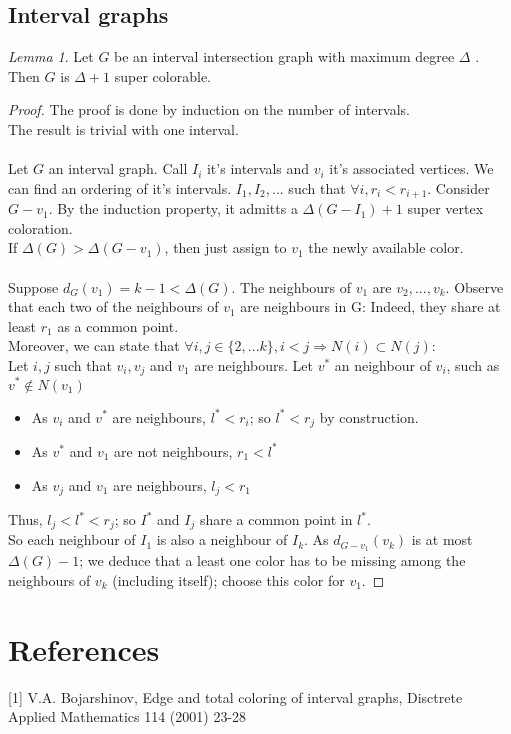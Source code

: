 \documentclass[12pt]{article}
\theoremstyle{definition}
\theoremstyle{remark}
\newtheorem{lemma}[theorem]{Lemma}
\begin{document}
\subsection{Interval graphs}

\begin{lemma}
    Let $G$ be an interval intersection graph with maximum degree $\Delta$ . Then $G$ is $\Delta+1$ super colorable. 
\end{lemma}

\begin{proof}
    The proof is done by induction on the number of intervals.\\
    The result is trivial with one interval. \\ \\
    Let $G$ an interval graph. Call $I_i$ it's intervals and $v_i$ it's associated vertices.
    We can find an ordering of it's intervals. $I_1, I_2, ...$ such that $\forall i, r_i < r_{i+1}$.
    Consider $G-v_1$. By the induction property, it admitts a $\Delta(G-I_1)+1$ super vertex coloration. \\
    If $\Delta(G) > \Delta(G-v_1)$, then just assign to $v_1$ the newly available color.\\ \\
    Suppose $d_G(v_1) = k-1 < \Delta(G)$. The neighbours of $v_1$ are $v_2, ... , v_k$. Observe that each two of the neighbours of $v_1$ are neighbours in G:
    Indeed, they share at least $r_1$ as a common point. \\
    Moreover, we can state that $\forall i, j \in \{2, ... k\}, i<j \Rightarrow N(i) \subset N(j)$:\\
    Let $i, j$ such that $v_i, v_j$ and $v_1$ are neighbours. Let $v^*$ an neighbour of $v_i$, such as $v^* \notin N(v_1)$ 
    \begin{itemize}
        \item As $v_i$ and $v^*$ are neighbours, $l^* < r_i$; so $l^* < r_j$ by construction.
        \item As $v^*$ and $v_1$ are not neighbours, $r_1<l^*$
        \item As $v_j$ and $v_1$ are neighbours, $l_j<r_1$
    \end{itemize}
    Thus, $l_j< l^* < r_j$; so $I^*$ and $I_j$ share a common point in $l^*$. \\
    So each neighbour of $I_1$ is also a neighbour of $I_k$. As $d_{G-v_1}(v_k)$ is at most $\Delta(G)-1$; we deduce that a least one color has to be missing
    among the neighbours of $v_k$ (including itself); choose this color for $v_1$.  
\end{proof}

\section{References}
[1] V.A. Bojarshinov, Edge and total coloring of interval graphs, Disctrete Applied Mathematics 114 (2001) 23-28
\end{document}
